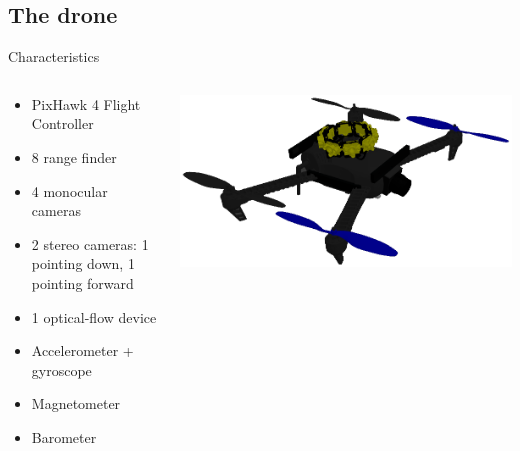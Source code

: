 \documentclass[serif]{beamer}
\begin{document}
    \subsection{The drone}
    \begin{frame}{Characteristics}
        \begin{columns}[c]
            \begin{column}{.5\textwidth}
                \begin{itemize}
                    \item{PixHawk 4 Flight Controller}
                    \item{8 range finder}
                    \item{4 monocular cameras}
                    \item{2 stereo cameras: 1 pointing down, 1 pointing forward}
                    \item{1 optical-flow device}
                    \item{Accelerometer + gyroscope}
                    \item{Magnetometer}
                    \item{Barometer}
                \end{itemize}
            \end{column}
            \begin{column}{.5\textwidth}
                \includegraphics[width=\linewidth]{Images/fig28-drone-sim-2.png}
            \end{column}
        \end{columns}
    \end{frame}
\end{document}
